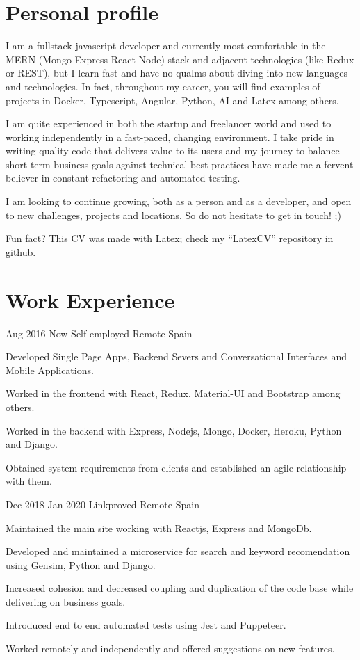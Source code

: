 \documentclass[10pt]{CurriculumVitae}
\begin{document}
  \makeheading


  \section{Personal profile}
    {
      I am a fullstack javascript developer and currently most comfortable in the MERN (Mongo-Express-React-Node) stack and adjacent technologies (like Redux or REST), but I learn fast and have no qualms about diving into new languages and technologies. In fact, throughout my career, you will find examples of projects in Docker, Typescript, Angular, Python, AI and Latex among others.
      
      I am quite experienced in both the startup and freelancer world and used to working independently in a fast-paced, changing environment. I take pride in writing quality code that delivers value to its users and my journey to balance short-term business goals against technical best practices have made me a fervent believer in constant refactoring and automated testing.

      I am looking to continue growing, both as a person and as a developer, and open to new challenges, projects and locations. So do not hesitate to get in touch! ;) 
      
      \null\hfill {\scriptsize Fun fact? This CV was made with Latex; check my ``LatexCV'' repository in github.}
    }


  \section{Work Experience}
      {Aug 2016-Now}
      {Self-employed}
      {Remote}
      {Spain}
      {
        \item Developed Single Page Apps, Backend Severs and Conversational Interfaces and Mobile Applications.
        \item Worked in the frontend with React, Redux, Material-UI and Bootstrap among others.
        \item Worked in the backend with Express, Nodejs, Mongo, Docker, Heroku, Python and Django.
        \item Obtained system requirements from clients and established an agile relationship with them.
      }

      {Dec 2018-Jan 2020}
      {Linkproved}
      {Remote}
      {Spain}
      {
        \item Maintained the main site working with Reactjs, Express and MongoDb.
        \item Developed and maintained a microservice for search and keyword recomendation using Gensim, Python and Django.
        \item Increased cohesion and decreased coupling and duplication of the code base while delivering on business goals.
        \item Introduced end to end automated tests using Jest and Puppeteer.
        \item Worked remotely and independently and offered suggestions on new features.
      }
   
\end{document}

